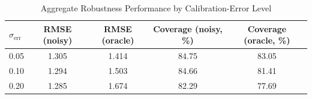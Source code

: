 \begin{table}[htbp]
\centering
\small
\caption{Aggregate Robustness Performance by Calibration-Error Level}
\label{tab:error-level-summary}
\begin{tabular}{lcccc}
\toprule
$\sigma_{\mathrm{err}}$ & RMSE (noisy) & RMSE (oracle) & Coverage (noisy, \%) & Coverage (oracle, \%) \\
\midrule
0.05 & 1.305 & 1.414 & 84.75 & 83.05 \\
0.10 & 1.294 & 1.503 & 84.66 & 81.41 \\
0.20 & 1.285 & 1.674 & 82.29 & 77.69 \\
\bottomrule
\end{tabular}
\end{table}

